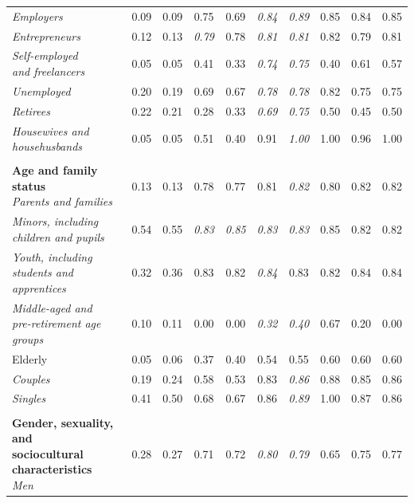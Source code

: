 \begin{table}[htb]
\begin{threeparttable}
\begin{tabular}{l c c c c c c c c c}
\textit{Employers} & 0.09 & 0.09 & 0.75 & 0.69 & \textit{0.84} & \textit{0.89} & 0.85 & 0.84 & 0.85 \\
\textit{Entrepreneurs} & 0.12 & 0.13 & \textit{0.79} & 0.78 & \textit{0.81} & \textit{0.81} & 0.82 & 0.79 & 0.81 \\
\shortstack[l]{\textit{Self-employed}\\[-3pt]\textit{and freelancers}} & 0.05 & 0.05 & 0.41 & 0.33 & \textit{0.74} & \textit{0.75} & 0.40 & 0.61 & 0.57 \\
\textit{Unemployed} & 0.20 & 0.19 & 0.69 & 0.67 & \textit{0.78} & \textit{0.78} & 0.82 & 0.75 & 0.75 \\
\textit{Retirees} & 0.22 & 0.21 & 0.28 & 0.33 & \textit{0.69} & \textit{0.75} & 0.50 & 0.45 & 0.50 \\
\shortstack[l]{\textit{Housewives and}\\[-3pt]\textit{househusbands}} & 0.05 & 0.05 & 0.51 & 0.40 & 0.91 & \textit{1.00} & 1.00 & 0.96 & 1.00 \\
\rule{0pt}{5pt} &  &  &  &  &  &  &  &  &  \\
\shortstack[l]{\textbf{Age and family status}\\[3pt]\textit{Parents and families}} & 0.13 & 0.13 & 0.78 & 0.77 & 0.81 & \textit{0.82} & 0.80 & 0.82 & 0.82 \\
\shortstack[l]{\textit{Minors, including}\\[-3pt]\textit{children and pupils}} & 0.54 & 0.55 & \textit{0.83} & \textit{0.85} & \textit{0.83} & \textit{0.83} & 0.85 & 0.82 & 0.82 \\
\shortstack[l]{\textit{Youth, including}\\[-3pt]\textit{students and apprentices}} & 0.32 & 0.36 & 0.83 & 0.82 & \textit{0.84} & 0.83 & 0.82 & 0.84 & 0.84 \\
\shortstack[l]{\textit{Middle-aged and}\\[-3pt]\textit{pre-retirement age groups}} & 0.10 & 0.11 & 0.00 & 0.00 & \textit{0.32} & \textit{0.40} & 0.67 & 0.20 & 0.00 \\
Elderly & 0.05 & 0.06 & 0.37 & 0.40 & 0.54 & 0.55 & 0.60 & 0.60 & 0.60 \\
\textit{Couples} & 0.19 & 0.24 & 0.58 & 0.53 & 0.83 & \textit{0.86} & 0.88 & 0.85 & 0.86 \\
\textit{Singles} & 0.41 & 0.50 & 0.68 & 0.67 & 0.86 & \textit{0.89} & 1.00 & 0.87 & 0.86 \\
\rule{0pt}{5pt} &  &  &  &  &  &  &  &  &  \\
\shortstack[l]{\textbf{Gender, sexuality, and}\\[-3pt]\textbf{sociocultural characteristics}\\[3pt]\textit{Men}} & 0.28 & 0.27 & 0.71 & 0.72 & \textit{0.80} & \textit{0.79} & 0.65 & 0.75 & 0.77 \\

\end{tabular}
\end{threeparttable}
\end{table}
